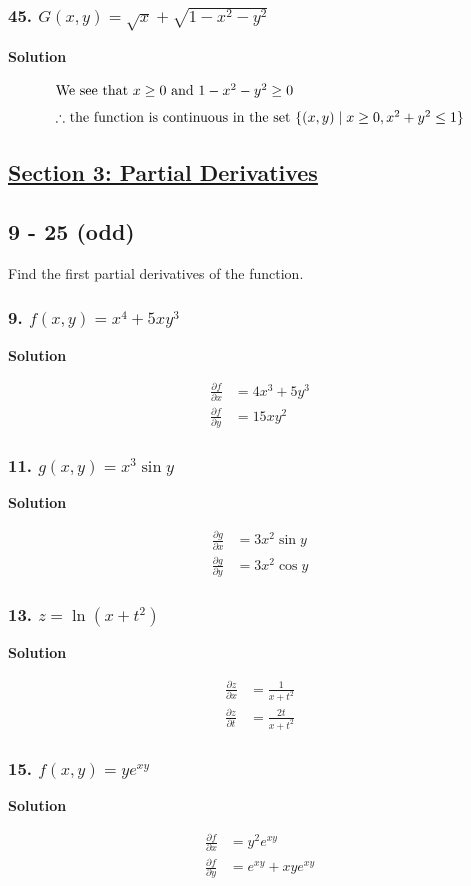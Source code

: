 \documentclass{article}
\newcommand{\such}{\; | \;}
\newcommand{\solution}{\centerline{\textbf{Solution}}}
\begin{document}
\subsubsection*{45. $G(x,y) = \sqrt x + \sqrt{1 - x^2 - y^2}$}
\centerline{\textbf{Solution}}
\begin{align*}
    \intertext{We see that $x\geq 0$ and $1-x^2-y^2\geq 0$}
    \intertext{$\therefore$ the function is continuous in the set $\{(x,y)\such x\geq 0, x^2+y^2\leq 1\}$}
\end{align*}
\newpage
\begin{center}
    \section*{\underline{Section 3: Partial Derivatives}}
\end{center}
\subsection*{9 - 25 (odd)}
Find the first partial derivatives of the function.
\subsubsection*{9. $f(x,y) = x^4 + 5xy^3$}
\solution
\begin{align*}
    \frac{\partial f}{\partial x} &= 4x^3+5y^3 \\
    \frac{\partial f}{\partial y} &= 15xy^2
\end{align*}
\subsubsection*{11. $g(x,y) = x^3 \sin y$}
\solution
\begin{align*}
    \frac{\partial g}{\partial x} &= 3x^2\sin y \\
    \frac{\partial g}{\partial y} &= 3x^2\cos y 
\end{align*}
\subsubsection*{13. $z = \ln (x + t^2)$}
\solution
\begin{align*}
    \frac{\partial z}{\partial x} &= \displaystyle\frac{1}{x+t^2} \\
    \frac{\partial z}{\partial t} &= \displaystyle\frac{2t}{x+t^2} 
\end{align*}
\subsubsection*{15. $f(x,y) = ye^{xy}$}
\solution
\begin{align*}
    \frac{\partial f}{\partial x} &= y^2e^{xy} \\
    \frac{\partial f}{\partial y} &= e^{xy} + xye^{xy}
\end{align*}
\end{document}

